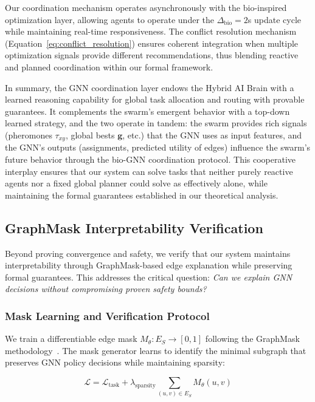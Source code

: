 \documentclass{article}
\begin{document}
Our coordination mechanism operates asynchronously with the bio-inspired optimization layer, allowing agents to operate under the $\Delta_{\text{bio}} = 2$s update cycle while maintaining real-time responsiveness. The conflict resolution mechanism (Equation~\ref{eq:conflict_resolution}) ensures coherent integration when multiple optimization signals provide different recommendations, thus blending reactive and planned coordination within our formal framework.

In summary, the GNN coordination layer endows the Hybrid AI Brain with a learned reasoning capability for global task allocation and routing with provable guarantees. It complements the swarm's emergent behavior with a top-down learned strategy, and the two operate in tandem: the swarm provides rich signals (pheromones $\tau_{xy}$, global bests $\mathbf{g}$, etc.) that the GNN uses as input features, and the GNN's outputs (assignments, predicted utility of edges) influence the swarm's future behavior through the bio-GNN coordination protocol. This cooperative interplay ensures that our system can solve tasks that neither purely reactive agents nor a fixed global planner could solve as effectively alone, while maintaining the formal guarantees established in our theoretical analysis.

\subsection{GraphMask Interpretability Verification}
\label{sec:graphmask-verification}

Beyond proving convergence and safety, we verify that our system maintains interpretability through GraphMask-based edge explanation while preserving formal guarantees. This addresses the critical question: \emph{Can we explain GNN decisions without compromising proven safety bounds?}

\subsubsection{Mask Learning and Verification Protocol}

We train a differentiable edge mask $M_\theta: E_S \rightarrow [0,1]$ following the GraphMask methodology~\cite{schlichtkrull2021interpreting}. The mask generator learns to identify the minimal subgraph that preserves GNN policy decisions while maintaining sparsity:

\begin{equation}
\mathcal{L} = \mathcal{L}_{\text{task}} + \lambda_{\text{sparsity}} \sum_{(u,v) \in E_S} M_\theta(u,v)
\end{equation}
\end{document}
